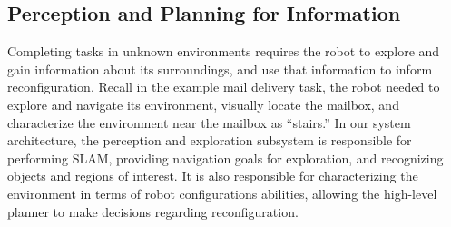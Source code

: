 \documentclass[journal]{IEEEtran}
\begin{document}
\subsection{Perception and Planning for Information}
\label{sec:exploration}
%



Completing tasks in unknown environments requires the robot to explore and gain information about its surroundings, and use that information to inform reconfiguration.
Recall in the example mail delivery task, the robot needed to explore and navigate its environment, visually locate the mailbox, and characterize the environment near the mailbox as ``stairs.''  In our system architecture, the perception and exploration subsystem is responsible for performing SLAM, providing navigation goals for exploration, and recognizing objects and regions of interest.  It is also responsible for characterizing the environment in terms of robot configurations abilities, allowing the high-level planner to make decisions regarding reconfiguration.
\end{document}
